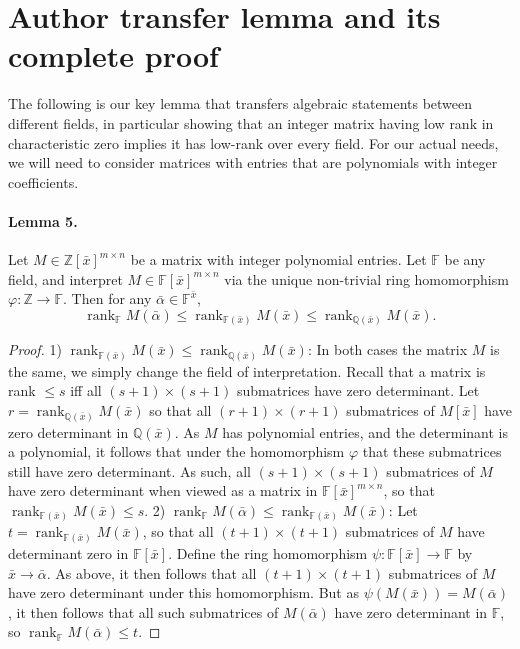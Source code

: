 \documentclass[10pt,a4paper]{article}
\begin{document}
\section*{Author transfer lemma and its complete proof}
The following is our key lemma that transfers algebraic statements between different fields, in particular showing that an integer matrix having low rank in characteristic zero implies it has low-rank over every field. For our actual needs, we will need to consider matrices with entries that are polynomials with integer coefficients.
\paragraph{Lemma 5.} Let $M\in\mathbb Z[\bar x]^{m\times n}$ be a matrix with integer polynomial entries. Let $\mathbb F$ be any field, and interpret $M\in\mathbb F[\bar x]^{m\times n}$ via the unique non-trivial ring homomorphism $\varphi:\mathbb Z\to\mathbb F$. Then for any $\bar\alpha\in\mathbb F^{\bar x}$,
\[\operatorname{rank}_{\mathbb F}M(\bar\alpha)\le\operatorname{rank}_{\mathbb F(\bar x)}M(\bar x)\le\operatorname{rank}_{\mathbb Q(\bar x)}M(\bar x).\]
\begin{proof}
1) $\operatorname{rank}_{\mathbb F(\bar x)}M(\bar x)\le\operatorname{rank}_{\mathbb Q(\bar x)}M(\bar x)$: In both cases the matrix $M$ is the same, we simply change the field of interpretation. Recall that a matrix is rank $\le s$ iff all $(s+1)\times(s+1)$ submatrices have zero determinant. Let $r=\operatorname{rank}_{\mathbb Q(\bar x)}M(\bar x)$ so that all $(r+1)\times(r+1)$ submatrices of $M[\bar x]$ have zero determinant in $\mathbb Q(\bar x)$. As $M$ has polynomial entries, and the determinant is a polynomial, it follows that under the homomorphism $\varphi$ that these submatrices still have zero determinant. As such, all $(s+1)\times(s+1)$ submatrices of $M$ have zero determinant when viewed as a matrix in $\mathbb F[\bar x]^{m\times n}$, so that $\operatorname{rank}_{\mathbb F(\bar x)}M(\bar x)\le s$.
2) $\operatorname{rank}_{\mathbb F}M(\bar\alpha)\le\operatorname{rank}_{\mathbb F(\bar x)}M(\bar x)$: Let $t=\operatorname{rank}_{\mathbb F(\bar x)}M(\bar x)$, so that all $(t+1)\times(t+1)$ submatrices of $M$ have determinant zero in $\mathbb F[\bar x]$. Define the ring homomorphism $\psi:\mathbb F[\bar x]\to\mathbb F$ by $\bar x\to\bar\alpha$. As above, it then follows that all $(t+1)\times(t+1)$ submatrices of $M$ have zero determinant under this homomorphism. But as $\psi(M(\bar x))=M(\bar\alpha)$, it then follows that all such submatrices of $M(\bar\alpha)$ have zero determinant in $\mathbb F$, so $\operatorname{rank}_{\mathbb F}M(\bar\alpha)\le t$.
\end{proof}
\end{document}
